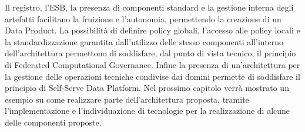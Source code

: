 \documentclass[a4paper,12pt]{report}
\begin{document}
Il registro, l'ESB, la presenza di componenti standard e la gestione interna degli artefatti facilitano la fruizione e l'autonomia, permettendo la creazione di un Data Product.
La possibilità di definire policy globali, l'accesso alle policy locali e la standardizzazione garantita dall'utilizzo delle stesso componenti all'interno dell'architettura permettono di soddisfare, dal punto di vista tecnico, il principio di Federated Computational Governance.
Infine la presenza di un'architettura per la gestione delle operazioni tecniche condivise dai domini permette di soddisfare il principio di Self-Serve Data Platform.
Nel prossimo capitolo verrà mostrato un esempio su come realizzare parte dell'architettura proposta, tramite l'implementazione e l'individuazione di tecnologie per la realizzazione di alcune delle componenti proposte.
\end{document}
